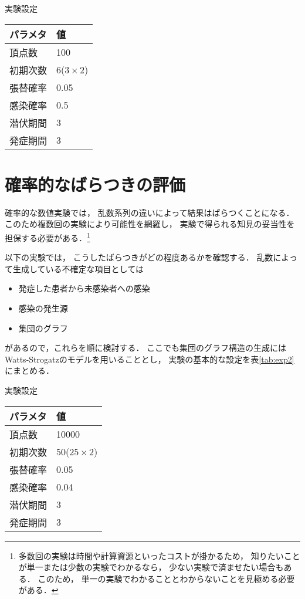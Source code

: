\documentclass[10pt,oneside]{scrartcl}
\begin{document}
\begin{margintable}
  \caption{実験設定}
  \label{tab:exp1}
  \small
  \begin{tabular}{ll}
    \toprule
    パラメタ&値 \\
    \midrule
    頂点数&100 \\
    初期次数&6\;($3\times2$) \\
    張替確率&0.05 \\
    感染確率&0.5 \\
    潜伏期間&3 \\
    発症期間&3 \\
    \bottomrule
  \end{tabular}
\end{margintable}

\section{確率的なばらつきの評価}
\label{sec:org378b935}

確率的な数値実験では，
乱数系列の違いによって結果はばらつくことになる．
このため複数回の実験により可能性を網羅し，
実験で得られる知見の妥当性を担保する必要がある．\footnote{多数回の実験は時間や計算資源といったコストが掛かるため，
知りたいことが単一または少数の実験でわかるなら，
少ない実験で済ませたい場合もある．
このため，
単一の実験でわかることとわからないことを見極める必要がある．}

以下の実験では，
こうしたばらつきがどの程度あるかを確認する．
乱数によって生成している不確定な項目としては
\begin{itemize}
\item 発症した患者から未感染者への感染
\item 感染の発生源
\item 集団のグラフ
\end{itemize}
があるので，これらを順に検討する．
ここでも集団のグラフ構造の生成には
Watts-Strogatzのモデルを用いることとし，
実験の基本的な設定を表\ref{tab:exp2}にまとめる．

\begin{margintable}
  \caption{実験設定}
  \label{tab:exp2}
  \small
  \begin{tabular}{ll}
    \toprule
    パラメタ&値 \\
    \midrule
    頂点数&10000 \\
    初期次数&50\;($25\times2$) \\
    張替確率&0.05 \\
    感染確率&0.04 \\
    潜伏期間&3 \\
    発症期間&3 \\
    \bottomrule
  \end{tabular}
\end{margintable}
\end{document}
